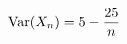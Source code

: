 \documentclass[preview]{standalone}
\begin{document}
\begin{align*}
\special{dvisvgm:raw <g id='unique000'>}\operatorname{Var}(X_n)=5-\frac{25}{n}\special{dvisvgm:raw </g>}
\end{align*}
\end{document}
